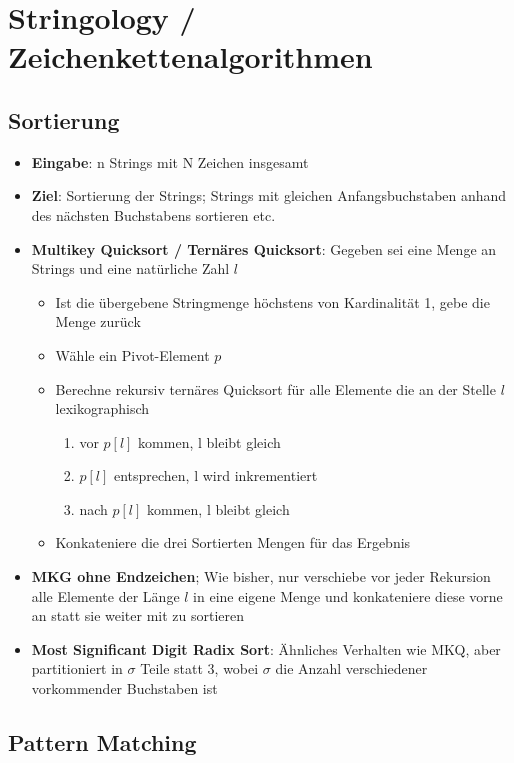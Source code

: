 \section{Stringology / Zeichenkettenalgorithmen}%
\label{str:sec:stringology}

\subsection{Sortierung}%
\label{str:sub:sortierung}

\begin{itemize}
	\item \textbf{Eingabe}: n Strings mit N Zeichen insgesamt
	\item \textbf{Ziel}: Sortierung der Strings; Strings mit gleichen Anfangsbuchstaben anhand des nächsten Buchstabens sortieren etc.
	\item \textbf{Multikey Quicksort / Ternäres Quicksort}: Gegeben sei eine Menge an Strings und eine natürliche Zahl $l$
	\begin{itemize}
		\item Ist die übergebene Stringmenge höchstens von Kardinalität 1, gebe die Menge zurück
		\item Wähle  ein Pivot-Element $p$
		\item Berechne rekursiv ternäres Quicksort für alle Elemente die an der Stelle $l$ lexikographisch
		\begin{enumerate}
			\item vor $p[l]$ kommen, l bleibt gleich
			\item $p[l]$ entsprechen, l wird inkrementiert
			\item nach $p[l]$ kommen, l bleibt gleich
		\end{enumerate}
		\item Konkateniere die drei Sortierten Mengen für das Ergebnis
	\end{itemize}
	\item \textbf{MKG ohne Endzeichen}; Wie bisher, nur verschiebe vor jeder Rekursion alle Elemente der Länge $l$ in eine eigene Menge und konkateniere diese vorne an statt sie weiter mit zu sortieren
	\item \textbf{Most Significant Digit Radix Sort}: Ähnliches Verhalten wie MKQ, aber partitioniert in $\sigma$ Teile statt 3, wobei $\sigma$ die Anzahl verschiedener vorkommender Buchstaben ist
\end{itemize}

\subsection{Pattern Matching}%
\label{str:sub:pattern_matching}

